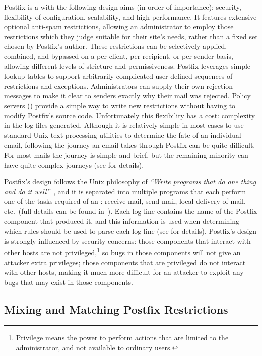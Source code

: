 Postfix is a  with the following design aims
(in order of importance): security, flexibility of configuration,
scalability, and high performance.  It features extensive optional
anti-spam restrictions, allowing an administrator to employ those
restrictions which they judge suitable for their site's needs, rather than
a fixed set chosen by Postfix's author.  These restrictions can be
selectively applied, combined, and bypassed on a per-client, per-recipient,
or per-sender basis, allowing different levels of stricture and
permissiveness.  Postfix leverages simple lookup tables to support
arbitrarily complicated user-defined sequences of restrictions and
exceptions.  Administrators can supply their own rejection messages to make
it clear to senders exactly why their mail was rejected.  Policy servers
() provide a simple way to write new
restrictions without having to modify Postfix's source code.  Unfortunately
this flexibility has a cost: complexity in the log files generated.
Although it is relatively simple in most cases to use standard Unix text
processing utilities to determine the fate of an individual email,
following the journey an email takes through Postfix can be quite
difficult.  For most mails the journey is simple and brief, but the
remaining minority can have quite complex journeys (see
 for details).

Postfix's design follows the Unix philosophy of \textit{``Write programs
that do one thing and do it well''\/}~\cite{unix-philosophy}, and it is
separated into multiple programs that each perform one of the tasks
required of an \@: receive mail, send mail, local delivery of
mail, etc.\ (full details can be found in~\cite{postfix-overview}).  Each
log line contains the name of the Postfix component that produced it, and
this information is used when determining which rules should be used to
parse each log line (see  for details).
Postfix's design is strongly influenced by security concerns: those
components that interact with other hosts are not
privileged,\footnote{Privilege means the power to perform actions that are
limited to the administrator, and not available to ordinary users.} so bugs
in those components will not give an attacker extra privileges; those
components that are privileged do not interact with other hosts, making it
much more difficult for an attacker to exploit any bugs that may exist in
those components.

\subsection{Mixing and Matching Postfix Restrictions}


